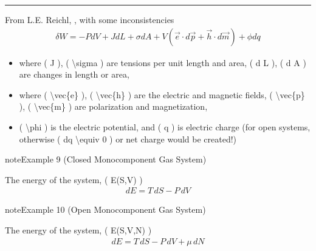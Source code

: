 \documentclass[letterpaper,10pt,english]{jupyterBook}
\begin{document}
\bigskip\hrule\bigskip


\sphinxAtStartPar
From L.E. Reichl, , with some inconsistencies  
\begin{equation*}
\begin{split}
\delta W = - P dV + J dL + \sigma d A + V \left( \vec{e} \cdot d \vec{p} + \vec{h} \cdot d \vec{m}\right) + \phi d q
\end{split}
\end{equation*}\begin{itemize}
\item {} 
\sphinxAtStartPar
where ( J ), ( \textbackslash{}sigma ) are tensions per unit length and area, ( d L ), ( d A ) are changes in length or area,

\item {} 
\sphinxAtStartPar
where ( \textbackslash{}vec\{e\} ), ( \textbackslash{}vec\{h\} ) are the electric and magnetic fields, ( \textbackslash{}vec\{p\} ), ( \textbackslash{}vec\{m\} ) are polarization and magnetization,

\item {} 
\sphinxAtStartPar
( \textbackslash{}phi ) is the electric potential, and ( q ) is electric charge (for open systems, otherwise ( dq \textbackslash{}equiv 0 ) or net charge would be created!)

\end{itemize}
\label{ch/principles-gibbs-phase-rule:example-12}
\begin{sphinxadmonition}{note}{Example 9 (Closed Monocomponent Gas System)}



\sphinxAtStartPar
The energy of the system, ( E(S,V) )
\begin{equation*}
\begin{split}
dE = T \, dS - P \, dV
\end{split}
\end{equation*}\end{sphinxadmonition}
\label{ch/principles-gibbs-phase-rule:example-13}
\begin{sphinxadmonition}{note}{Example 10 (Open Monocomponent Gas System)}



\sphinxAtStartPar
The energy of the system, ( E(S,V,N) )
\begin{equation*}
\begin{split}
dE = T \, dS - P \, dV + \mu \, dN
\end{split}
\end{equation*}\end{sphinxadmonition}
\end{document}
